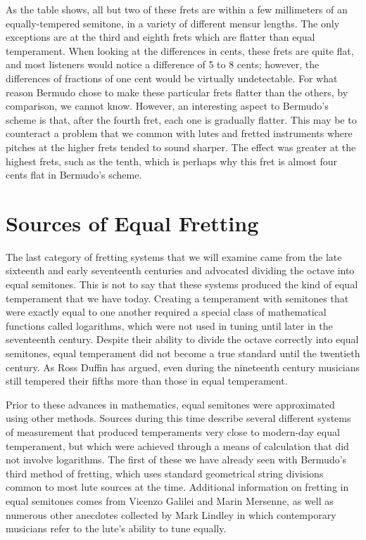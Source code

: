 As the table shows, all but two of these frets are within a few millimeters of an
equally-tempered semitone, in a variety of different mensur lengths. The only
exceptions are at the third and eighth frets which are flatter than equal temperament.
When looking at the differences in cents, these frets are quite flat, and
most listeners would notice a difference of 5 to 8 cents; however, the differences of
fractions of one cent would be virtually undetectable.  For what reason Bermudo chose
to make these particular frets flatter than the others, by comparison, we cannot know.
However, an interesting aspect to Bermudo's scheme is that, after the fourth fret, each
one is gradually flatter.  This may be to counteract a problem that we common with lutes
and fretted instruments where pitches at the higher frets tended to sound sharper. The
effect was greater at the highest frets, such as the tenth, which is perhaps why this
fret is almost four cents flat in Bermudo's scheme.

\section{Sources of Equal Fretting}

The last category of fretting systems that we will examine came from the late sixteenth
and early seventeenth centuries and advocated dividing the octave into equal semitones.
This is not to say that these systems produced the kind of equal temperament that we
have today. Creating a temperament with semitones that were exactly equal to one
another required a special class of mathematical functions called logarithms, which
were not used in tuning until later in the seventeenth century.  Despite their ability to
divide the octave correctly into equal semitones, equal temperament did not become a
true standard until the twentieth century.  As Ross Duffin has argued, even during the
nineteenth century musicians still tempered their fifths more than those in equal
temperament.

Prior to these advances in mathematics, equal semitones were approximated using other
methods. Sources during this time describe several different systems of measurement that
produced temperaments very close to modern-day equal temperament, but which were achieved
through a means of calculation that did not involve logarithms.  The first of
these we have already seen with Bermudo's third method of fretting, which uses
standard geometrical string divisions common to
most lute sources at the time.  Additional information on fretting in equal semitones comes
from Vicenzo Galilei and Marin Mersenne, as well as numerous other anecdotes
collected by Mark Lindley in which contemporary musicians refer to the lute's
ability to tune equally.

